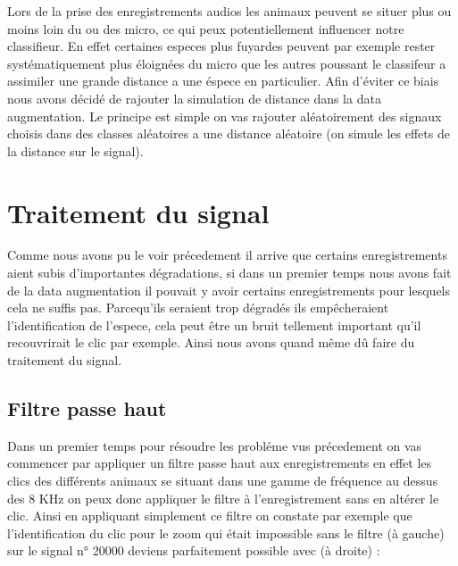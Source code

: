 Lors de la prise des enregistrements audios les animaux peuvent se situer plus ou moins loin du ou des micro, ce qui peux potentiellement influencer notre classifieur. En effet certaines especes plus fuyardes peuvent par exemple rester systématiquement plus éloignées du micro que les autres poussant le classifeur a assimiler une grande distance a une éspece en particulier.
Afin d'éviter ce biais nous avons décidé de rajouter la simulation de distance dans la data augmentation.
Le principe est simple on vas rajouter aléatoirement des signaux choisis dans des classes aléatoires a une distance aléatoire (on simule les effets de la distance sur le signal).


\hypertarget{Traitement-du-signal}{%
\section{Traitement du signal}
\label{Traitement-du-signal}}

Comme nous avons pu le voir précedement il arrive que certains enregistrements aient subis d'importantes dégradations, si dans un premier temps nous avons fait de la data augmentation il pouvait y avoir certains enregistrements pour lesquels cela ne suffis pas. Parcequ'ils seraient trop dégradés ils empêcheraient l'identification de l'espece, cela peut être un bruit tellement important qu'il recouvrirait le clic par exemple. Ainsi nous avons quand même dû faire du traitement du signal.

\hypertarget{Filtre-passe-haut}{%
\subsection{Filtre passe haut}
\label{Filtre-passe-haut}}

Dans un premier temps pour résoudre les probléme vus précedement on  vas commencer par appliquer un filtre passe haut aux enregistrements en effet les clics des différents animaux se situant dans une gamme de fréquence au dessus des 8 KHz on peux donc appliquer le filtre à l'enregistrement sans en altérer le clic.
Ainsi en appliquant simplement ce filtre on constate par exemple que l'identification du clic pour le zoom qui était impossible sans le filtre (à gauche) sur le signal n° 20000 deviens parfaitement possible avec (à droite) :

